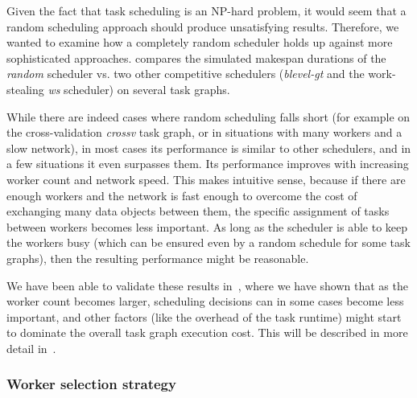 Given the fact that task scheduling is an NP-hard problem, it would seem that a random scheduling
approach should produce unsatisfying results. Therefore, we wanted to examine how a completely
random scheduler holds up against more sophisticated approaches.  compares
the simulated makespan durations of the \emph{random} scheduler vs. two other competitive
schedulers (\emph{blevel-gt} and the work-stealing \emph{ws} scheduler) on
several task graphs.

While there are indeed cases where random scheduling falls short (for example on the
cross-validation \emph{crossv} task graph, or in situations with many workers and a slow
network), in most cases its performance is similar to other schedulers, and in a few situations it
even surpasses them. Its performance improves with increasing worker count and network speed. This
makes intuitive sense, because if there are enough workers and the network is fast enough to
overcome the cost of exchanging many data objects between them, the specific assignment of tasks
between workers becomes less important. As long as the scheduler is able to keep the workers busy
(which can be ensured even by a random schedule for some task graphs), then the resulting
performance might be reasonable.

We have been able to validate these results in~\cite{rsds}, where we have shown that as
the worker count becomes larger, scheduling decisions can in some cases become less important, and
other factors (like the overhead of the task runtime) might start to dominate the overall task
graph execution cost. This will be described in more detail in~.

\subsubsection*{Worker selection strategy}

